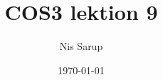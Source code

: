 \documentclass[a4wide,10pt]{article}
\begin{document}
\title{COS3 lektion 9}
\author{Nis Sarup}
\date{\today}
\maketitle


\addtocounter{section}{8}
\end{document}
